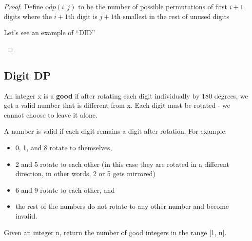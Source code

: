 \documentclass[11pt]{article}
\begin{document}
\begin{proof}
Define o\(dp(i,j)\) to be the number of possible permutations of first \(i+1\) digits where
the \(i+1\)th digit is \(j+1\)th smallest in the rest of unused digits

Let's see an example of ``DID''
\begin{center}
\end{center}
\end{proof}


\subsection{Digit DP}
\label{sec:orga5e0c42}
\begin{problem}
An integer x is a \textbf{good} if after rotating each digit individually by 180 degrees, we get a valid
number that is different  from x. Each digit must be rotated - we cannot choose to leave it alone.

A number is valid if each digit remains a digit after rotation. For example:
\begin{itemize}
\item 0, 1, and 8 rotate to themselves,
\item 2 and 5 rotate to each other (in this case they are rotated in a different direction, in other
words, 2 or 5 gets mirrored)
\item 6 and 9 rotate to each other, and
\item the rest of the numbers do not rotate to any other number and become invalid.
\end{itemize}

Given an integer n, return the number of good integers in the range [1, n].
\end{problem}
\end{document}
